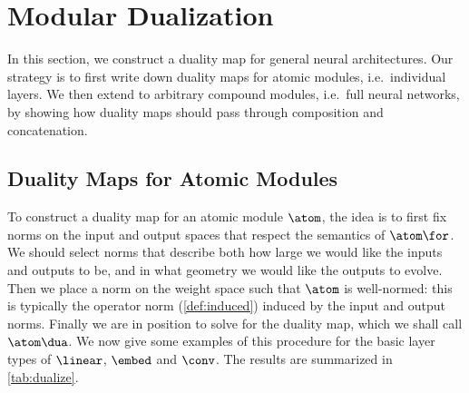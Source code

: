 
\section{Modular Dualization}
\label{sec:steepest-descent-in-the-modular-norm}

In this section, we construct a duality map for general neural architectures. Our strategy is to first write down duality maps for atomic modules, i.e.\ individual layers. We then extend to arbitrary compound modules, i.e.\ full neural networks, by showing how duality maps should pass through composition and concatenation.

\subsection{Duality Maps for Atomic Modules}
\label{sec:atomic-duality}

To construct a duality map for an atomic module $\atom$, the idea is to first fix norms on the input and output spaces that respect the semantics of $\atom\for$. We should select norms that describe both how large we would like the inputs and outputs to be, and in what geometry we would like the outputs to evolve. Then we place a norm on the weight space such that $\atom$ is well-normed: this is typically the operator norm (\cref{def:induced}) induced by the input and output norms. Finally we are in position to solve for the duality map, which we shall call $\atom\dua$. We now give some examples of this procedure for the basic layer types of $\linear$, $\embed$ and $\conv$. The results are summarized in \cref{tab:dualize}.

